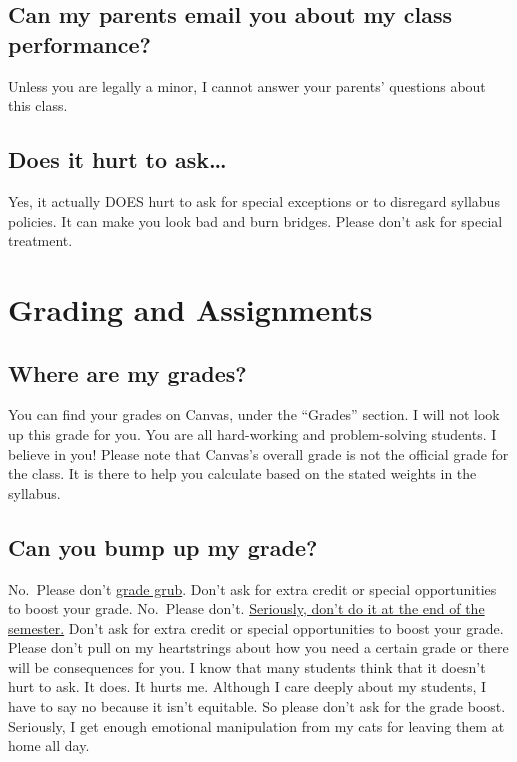 \documentclass[
]{book}
\begin{document}
\subsection{Can my parents email you about my class performance?}\label{can-my-parents-email-you-about-my-class-performance}

Unless you are legally a minor, I cannot answer your parents' questions about this class.

\subsection{Does it hurt to ask\ldots{}}\label{does-it-hurt-to-ask}

Yes, it actually DOES hurt to ask for special exceptions or to disregard syllabus policies. It can make you look bad and burn bridges. Please don't ask for special treatment.

\section{Grading and Assignments}\label{grading}

\subsection{Where are my grades?}\label{where-are-my-grades}

You can find your grades on Canvas, under the ``Grades'' section. I will not look up this grade for you. You are all hard-working and problem-solving students. I believe in you! Please note that Canvas's overall grade is not the official grade for the class. It is there to help you calculate based on the stated weights in the syllabus.

\subsection{Can you bump up my grade?}\label{can-you-bump-up-my-grade}

No.~Please don't \href{https://undergraduateswrite.com/2019/05/10/i-say-grade-grubbing-you-say-it-doesnt-hurt-to-ask-on-asking-teachers-to-bump-your-final-grade/}{grade grub}. Don't ask for extra credit or special opportunities to boost your grade. No.~Please don't. \href{https://undergraduateswrite.com/2019/05/10/i-say-grade-grubbing-you-say-it-doesnt-hurt-to-ask-on-asking-teachers-to-bump-your-final-grade/}{Seriously, don't do it at the end of the semester.} Don't ask for extra credit or special opportunities to boost your grade. Please don't pull on my heartstrings about how you need a certain grade or there will be consequences for you. I know that many students think that it doesn't hurt to ask. It does. It hurts me. Although I care deeply about my students, I have to say no because it isn't equitable. So please don't ask for the grade boost. Seriously, I get enough emotional manipulation from my cats for leaving them at home all day.
\end{document}
